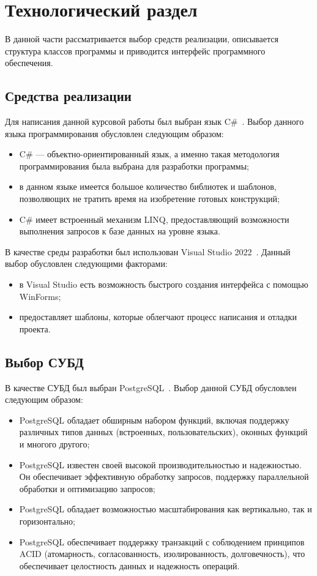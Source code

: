 \section{Технологический раздел}
В данной части рассматривается выбор средств реализации, описывается структура классов программы и приводится интерфейс программного обеспечения.

\subsection{Средства реализации}

Для написания данной курсовой работы был выбран язык C\#~\cite{cpp-lang}.
Выбор данного языка программирования обусловлен следующим образом:
\begin{itemize}
	\item C\# --- объектно-ориентированный язык, а именно такая методология
	программирования была выбрана для разработки программы;
	\item в данном языке имеется большое количество библиотек и шаблонов,
	позволяющих не тратить время на изобретение готовых конструкций;
	\item C\# имеет встроенный механизм LINQ, предоставляющий возможности выполнения запросов к базе данных на уровне языка.
\end{itemize}

В качестве среды разработки был использован Visual Studio 2022~\cite{qt-creator}.
Данный выбор обусловлен следующими факторами:
\begin{itemize}
	\item в Visual Studio есть возможность быстрого создания интерфейса с помощью WinForms;
	\item предоставляет шаблоны, которые облегчают процесс написания и отладки проекта.
\end{itemize}

\subsection{Выбор СУБД}
В качестве СУБД был выбран PostgreSQL~\cite{cpp-lang}.
Выбор данной СУБД обусловлен следующим образом:

\begin{itemize}
	\item PostgreSQL обладает обширным набором функций, включая поддержку различных типов данных (встроенных, пользовательских), оконных функций и многого другого;
	\item PostgreSQL известен своей высокой производительностью и надежностью. Он обеспечивает эффективную обработку запросов, поддержку параллельной обработки и оптимизацию запросов;
	\item PostgreSQL обладает возможностью масштабирования как вертикально, так и горизонтально;
	\item PostgreSQL обеспечивает поддержку транзакций с соблюдением принципов ACID (атомарность, согласованность, изолированность, долговечность), что обеспечивает целостность данных и надежность операций.
\end{itemize}

